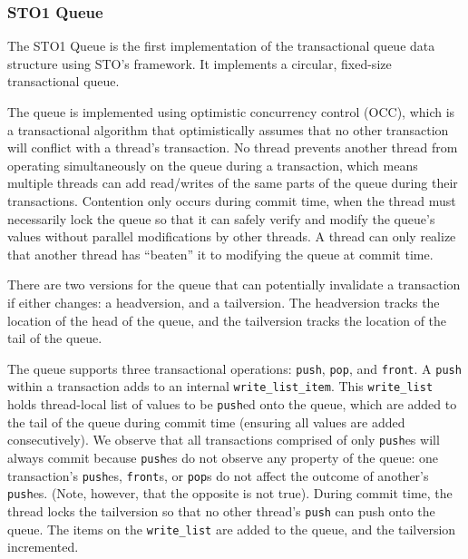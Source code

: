 \subsubsection{STO1 Queue}
The STO1 Queue is the first implementation of the transactional queue data structure using STO’s framework. It implements a circular, fixed-size transactional queue.

The queue is implemented using optimistic concurrency control (OCC), which is a transactional algorithm that optimistically assumes that no other transaction will conflict with a thread’s transaction. No thread prevents another thread from operating simultaneously on the queue during a transaction, which means multiple threads can add read/writes of the same parts of the queue during their transactions. Contention only occurs during commit time, when the thread must necessarily lock the queue so that it can safely verify and modify the queue’s values without parallel modifications by other threads. A thread can only realize that another thread has “beaten” it to modifying the queue at commit time.

There are two versions for the queue that can potentially invalidate a transaction if either changes: a headversion, and a tailversion. The headversion tracks the location of the head of the queue, and the tailversion tracks the location of the tail of the queue.

The queue supports three transactional operations: \texttt{push}, \texttt{pop}, and \texttt{front}. A \texttt{push} within a transaction adds to an internal \texttt{write\_list\_item}. This \texttt{write\_list} holds thread-local list of values to be \texttt{push}ed onto the queue, which are added to the tail of the queue during commit time (ensuring all values are added consecutively). We observe that all transactions comprised of only \texttt{push}es will always commit because \texttt{push}es do not observe any property of the queue: one transaction’s \texttt{push}es, \texttt{front}s, or \texttt{pop}s do not affect the outcome of another’s \texttt{push}es. (Note, however, that the opposite is not true). During commit time, the thread locks the tailversion so that no other thread’s \texttt{push} can push onto the queue. The items on the \texttt{write\_list} are added to the queue, and the tailversion incremented.

